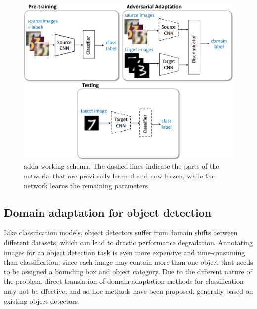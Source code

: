 \documentclass[%
    corpo=12pt,
    twoside,
    stile=classica,   
    tipotesi=magistrale,
    evenboxes,
    english,
	numerazioneromana,
]{toptesi}
\begin{document}
\begin{figure}[ht]
	\centering
	\includegraphics[width=.75\linewidth]{imgs/adda.png}
	\caption[\acrshort{adda} working schema]{\acrshort{adda} working schema\cite{tzeng2017adversarial}. The dashed lines indicate the parts of the networks that are previously learned and now frozen, while the network learns the remaining parameters.}
	\label{fig:adda}
\end{figure}


\subsection{Domain adaptation for object detection}
Like classification models, object detectors suffer from domain shifts between different datasets, which can lead to drastic performance degradation. Annotating images for an object detection task is even more expensive and time-consuming than classification, since each image may contain more than one object that needs to be assigned a bounding box and object category. Due to the different nature of the problem, direct translation of domain adaptation methods for classification may not be effective, and ad-hoc methods have been proposed, generally based on existing object detectors.
\end{document}
